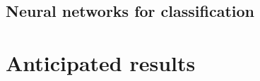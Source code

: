 \documentclass[12pt]{article}
\begin{document}
\subsection{Neural networks for classification}

\section{Anticipated results}

\pagebreak




%
%

\itemize
\end{document}
